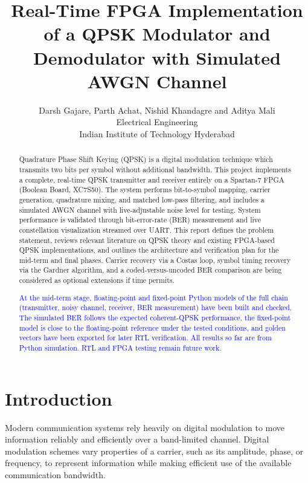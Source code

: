 \documentclass[10pt,twocolumn,letterpaper]{article}
\begin{document}
\title{Real-Time FPGA Implementation of a QPSK Modulator and Demodulator with Simulated AWGN Channel}
\author{Darsh Gajare, Parth Achat, Nishid Khandagre and Aditya Mali\\
Electrical Engineering\\
Indian Institute of Technology Hyderabad}
\maketitle

\begin{abstract}
Quadrature Phase Shift Keying (QPSK) is a digital modulation technique which transmits two bits per symbol without additional bandwidth. This project implements a complete, real-time QPSK transmitter and receiver entirely on a Spartan-7 FPGA (Boolean Board, XC7S50). The system performs bit-to-symbol mapping, carrier generation, quadrature mixing, and matched low-pass filtering, and includes a simulated AWGN channel with live-adjustable noise level for testing. System performance is validated through bit-error-rate (BER) measurement and live constellation visualization streamed over UART. This report defines the problem statement, reviews relevant literature on QPSK theory and existing FPGA-based QPSK implementations, and outlines the architecture and verification plan for the mid-term and final phases. Carrier recovery via a Costas loop, symbol timing recovery via the Gardner algorithm, and a coded-versus-uncoded BER comparison are being considered as optional extensions if time permits.

\textcolor{blue}{At the mid-term stage, floating-point and fixed-point Python models of the full chain (transmitter, noisy channel, receiver, BER measurement) have been built and checked. The simulated BER follows the expected coherent-QPSK performance, the fixed-point model is close to the floating-point reference under the tested conditions, and golden vectors have been exported for later RTL verification. All results so far are from Python simulation. RTL and FPGA testing remain future work.}
\end{abstract}

\section{Introduction}
\label{sec:intro}

Modern communication systems rely heavily on digital modulation to
move information reliably and efficiently over a band-limited
channel. Digital modulation schemes vary properties of a carrier, such
as its amplitude, phase, or frequency, to represent information while
making efficient use of the available communication bandwidth.
\end{document}
